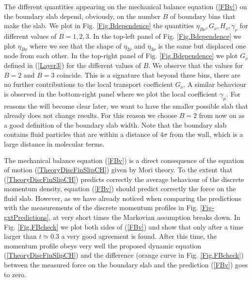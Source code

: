 \documentclass[b5paper,openright,10pt]{book}
\begin{document}
The different quantities appearing  on the mechanical balance equation
(\ref{FBv}) on the boundary slab  depend, obviously, on the number $B$
of   boundary  bins   that   make   the  slab.    We   plot  in   Fig.
\ref{Fig.Bdependence}  the  quantities  $\eta_{B\nu},G_\nu, H_\nu, \gamma_\nu$
for   different  values   of   $B=1,2,3$.   In   the   top-left  panel   of
Fig. \ref{Fig.Bdependence} we plot $\eta_{B\nu}$ where we see that the
shape of $\eta_{2\nu}$ and $\eta_{3\nu}$ is the same but displaced one
node    from    each    other.      In    the    top-right    panel    of
Fig. \ref{Fig.Bdependence}  we plot $G_\nu$ defined  in (\ref{Layer3})
for the different values of $B$.  We observe that the values for $B=2$
and $B=3$ coincide. This is a  signature that beyond three bins, there
are  no  further  contributions  to the  local  transport  coefficient
$G_\nu$. A similar behaviour is observed  in the bottom-right panel where we
plot the local  coefficient $\gamma_\mu$. For reasons  the will become
clear later,  we want to have  the smaller possible slab  that already
does not change  results. For this reason we choose  $B=2$ from now on
as  a good  definition  of  the boundary  slab  width.  Note that  the
boundary slab contains  fluid particles that are within  a distance of
$4\sigma$ from the wall, which is a large distance in molecular terms.

The  mechanical balance  equation (\ref{FBv})  is a  direct
consequence of  the equation of motion  (\ref{TheoryDiscFinSlipCH}) given by
Mori  theory.   To  the  extent  that  (\ref{TheoryDiscFinSlipCH})  predicts
correctly the average behaviour of  the discrete momentum density, equation
(\ref{FBv})  should predict  correctly the  force on  the fluid  slab.
However, as  we have  already noticed  when comparing  the predictions
with   the  measurements   of  the   discrete  momentum   profiles  in
Fig. \ref{Fig-gxtPredictions}, at very short  times the Markovian assumption breaks
down.  In Fig. \ref{Fig.FBcheck} we plot both sides of (\ref{FBv}) and
show that only  after a time larger than $t\simeq  0.3$ a very good
agreement is found.  After this  time, the momentum profile obeys very
well  the  proposed  dynamic equation  (\ref{TheoryDiscFinSlipCH})  and  the
difference (orange curve in  Fig. \ref{Fig.FBcheck}) between the measured
force  on the  boundary slab  and the  prediction (\ref{FBv})  goes to
zero.
\end{document}
